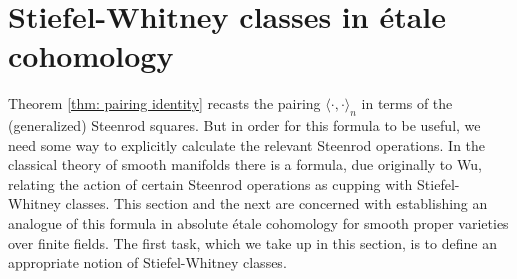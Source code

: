 \documentclass[10pt, reqno]{amsart}
\numberwithin{equation}{subsection}
\newcommand{\wt}[1]{\widetilde{#1}}
\newcommand{\Z}{\mathbf{Z}}
\DeclareMathOperator{\et}{\acute{e}t}
\DeclareMathOperator{\Sq}{Sq}
\newtheorem{prop}[thm]{Proposition}
\theoremstyle{remark}
\begin{document}
\begin{comment}
 Then Proposition \ref{prop: beta_2 identity} can be reformulated as: 
 \begin{prop}\label{prop: differens in BSS}
For $x \in {}^{2^n, j} E_2^{2k}$, we have the following identity on ${}^{2^n, 2j} E_2^{4k}$:
\[
d_2[2^{n-1} x^2]= [x \cdot \beta (x) + \wt{\Sq}^{2k} (\beta (x)) ].
\]
 \end{prop}
 
 
In these terms the proof of Theorem \ref{thm: pairing identity} can be reformulated as follows. For $x \in H^{2d}_{\et}(X; \Z/2^n\Z(d))$, we consider the trajectory of the term  $2^{n-1}x^2 \in H^{4d}_{\et}(X; \Z/2^n\Z(2d))$ in the spectral sequence ${}^{2^n, 2d}E_*^{4d}$. By Lemma \ref{lemma: bockstein_rank} any non-zero differential to the graded component of degree $4d+1$ on the $r$th page corresponds to a torsion summand in $H^{4d+1}_{\et}(X; \Z_2(2d))$, but by Poincar\'{e} duality $H^{4d+1}_{\et}(X; \Z_2 (2d)) \cong \Z_2$ is torsion-free, so any such differential vanishes. 

Now by Proposition \ref{prop: differens in BSS} the difference between the right and left sides  in Theorem \ref{thm: pairing identity} is such a differential, and the equality occurs in $H^{4d+1}_{\et}(X; \Z/2^n \Z(2d))$ rather than a subquotient thereof because all the previous (and indeed, all) the differentials to that graded component are zero. \qed

\end{comment}

\section{Stiefel-Whitney classes in \'{e}tale cohomology}\label{sec: SW}

Theorem \ref{thm: pairing identity} recasts the pairing $\langle \cdot, \cdot \rangle_n$ in terms of the (generalized) Steenrod squares. But in order for this formula to be useful, we need some way to explicitly calculate the relevant Steenrod operations. In the classical theory of smooth manifolds there is a formula, due originally to Wu, relating the action of certain Steenrod operations as cupping with Stiefel-Whitney classes. This section and the next are concerned with establishing an analogue of this formula in absolute \'{e}tale cohomology for smooth proper varieties over finite fields. The first task, which we take up in this section, is to define an appropriate notion of Stiefel-Whitney classes. 
\end{document}
